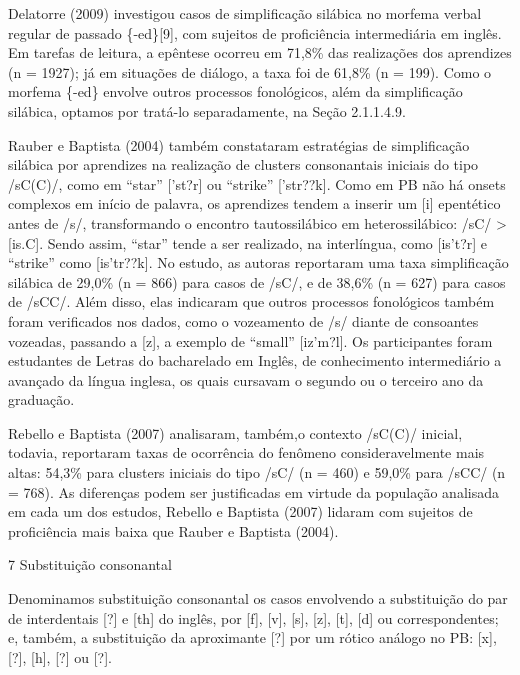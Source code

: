 Delatorre (2009) investigou casos de simplifica\c{c}\~ao sil\'abica no morfema
verbal regular de passado \{-ed\}{[}9{]}, com sujeitos de profici\^encia
intermedi\'aria em ingl\^es. Em tarefas de leitura, a ep\^entese ocorreu em
71,8\% das realiza\c{c}\~oes dos aprendizes (n = 1927); j\'a em situa\c{c}\~oes de
di\'alogo, a taxa foi de 61,8\% (n = 199). Como o morfema \{-ed\} envolve
outros processos fonol\'ogicos, al\'em da simplifica\c{c}\~ao sil\'abica, optamos
por trat\'a-lo separadamente, na Se\c{c}\~ao 2.1.1.4.9.

Rauber e Baptista (2004) tamb\'em constataram estrat\'egias de simplifica\c{c}\~ao
sil\'abica por aprendizes na realiza\c{c}\~ao de clusters consonantais iniciais
do tipo /sC(C)/, como em ``star'' {[}'st?r{]} ou ``strike''
{[}'str??k{]}. Como em PB n\~ao h\'a onsets complexos em in\'icio de palavra,
os aprendizes tendem a inserir um {[}i{]} epent\'etico antes de /s/,
transformando o encontro tautossil\'abico em heterossil\'abico: /sC/
\textgreater{} {[}is.C{]}. Sendo assim, ``star'' tende a ser realizado,
na interl\'ingua, como {[}is't?r{]} e ``strike'' como {[}is'tr??k{]}. No
estudo, as autoras reportaram uma taxa simplifica\c{c}\~ao sil\'abica de 29,0\%
(n = 866) para casos de /sC/, e de 38,6\% (n = 627) para casos de /sCC/.
Al\'em disso, elas indicaram que outros processos fonol\'ogicos tamb\'em foram
verificados nos dados, como o vozeamento de /s/ diante de consoantes
vozeadas, passando a {[}z{]}, a exemplo de ``small'' {[}iz'm?l{]}. Os
participantes foram estudantes de Letras do bacharelado em Ingl\^es, de
conhecimento intermedi\'ario a avan\c{c}ado da l\'ingua inglesa, os quais
cursavam o segundo ou o terceiro ano da gradua\c{c}\~ao.

Rebello e Baptista (2007) analisaram, tamb\'em,o contexto /sC(C)/ inicial,
todavia, reportaram taxas de ocorr\^encia do fen\^omeno consideravelmente
mais altas: 54,3\% para clusters iniciais do tipo /sC/ (n = 460) e
59,0\% para /sCC/ (n = 768). As diferen\c{c}as podem ser justificadas em
virtude da popula\c{c}\~ao analisada em cada um dos estudos, Rebello e
Baptista (2007) lidaram com sujeitos de profici\^encia mais baixa que
Rauber e Baptista (2004).

7 Substitui\c{c}\~ao consonantal

Denominamos substitui\c{c}\~ao consonantal os casos envolvendo a substitui\c{c}\~ao
do par de interdentais {[}?{]} e {[}th{]} do ingl\^es, por {[}f{]},
{[}v{]}, {[}s{]}, {[}z{]}, {[}t{]}, {[}d{]} ou correspondentes; e,
tamb\'em, a substitui\c{c}\~ao da aproximante {[}?{]} por um r\'otico an\'alogo no
PB: {[}x{]}, {[}?{]}, {[}h{]}, {[}?{]} ou {[}?{]}.

